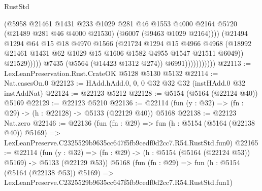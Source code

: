 \begin{lexlean}{RustStd}
\begin{coremodule}
                                    (@5958
                                      @21461
                                      @1431
                                      @233
                                      @1029
                                      @281
                                      @46
                                      @1553
                                      @4000
                                      @2164
                                      @5720
                                      (@21489 @281 @46 @4000 @21530)
                                      (@6007 (@9463 @1029 @2164))))
                                  (@21494
                                    @1294
                                    @64
                                    @15
                                    @18
                                    @4970
                                    @1566
                                    (@21724
                                      @1294
                                      @15
                                      @4966
                                      @4968
                                      (@18992
                                        @21461
                                        @1431
                                        @62
                                        @1029
                                        @15
                                        @1606
                                        @1582
                                        @4955
                                        @1547
                                        @21511
                                        @6049))
                                    @21529)))))
                          @7435
                          (@5564 (@14423 @1312 @274))
                          @6991)))))))))))
@22113 := LexLeanPreservation.Rust.CrateOK @5128 @5130 @5132
@22114 := Nat.casesOn.{0}
@22123 := HAdd.hAdd.{0, 0, 0} @32 @32 @32 (instHAdd.{0} @32 instAddNat)
@22124 := @22123 @5212
@22128 := @5154 (@5164 (@22124 @40)) @5169
@22129 := @22123 @5210
@22136 := @22114 (fun (y : @32) => (fn : @29) -> (h : @22128) -> @5133 (@22129 @40)) @5168
@22138 := @22123 Nat.zero
@22146 := @22136
    (fun (fn : @29) =>
    fun (h : @5154 (@5164 (@22138 @40)) @5169) =>
    LexLeanPreserve.C2325529b9635cc647f5fb9cedf0d2cc7.R54.RustStd.fun0)
@22165 := @22114
    (fun (y : @32) => (fn : @29) -> (h : @5154 (@5164 (@22124 @53)) @5169) -> @5133 (@22129 @53))
    @5168
    (fun (fn : @29) =>
    fun (h : @5154 (@5164 (@22138 @53)) @5169) =>
    LexLeanPreserve.C2325529b9635cc647f5fb9cedf0d2cc7.R54.RustStd.fun1)

\end{coremodule}
\end{lexlean}
